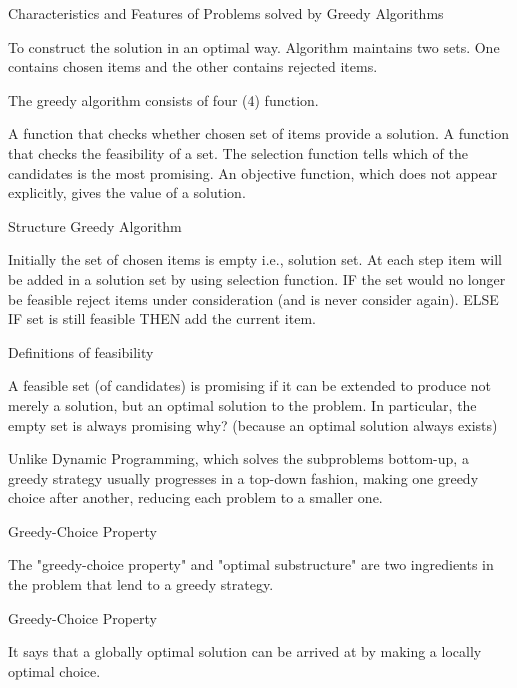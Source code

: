  

Characteristics and Features of Problems solved by Greedy Algorithms


To construct the solution in an optimal way. Algorithm maintains two sets. One contains chosen items and the other contains rejected items.

The greedy algorithm consists of four (4) function.

A function that checks whether chosen set of items provide a solution.
A function that checks the feasibility of a set.
The selection function tells which of the candidates is the most promising.
An objective function, which does not appear explicitly, gives the value of a solution.
 

Structure Greedy Algorithm

Initially the set of chosen items is empty i.e., solution set.
At each step
item will be added in a solution set by using selection function.
IF the set would no longer be feasible
reject items under consideration (and is never consider again).
ELSE IF set is still feasible THEN
add the current item.
 

Definitions of feasibility

A feasible set (of candidates) is promising if it can be extended to produce not merely a solution, but an optimal solution to the problem. In particular, the empty set is always promising why? (because an optimal solution always exists)

Unlike Dynamic Programming, which solves the subproblems bottom-up, a greedy strategy usually progresses in a top-down fashion, making one greedy choice after another, reducing each problem to a smaller one. 

Greedy-Choice Property

The "greedy-choice property" and "optimal substructure" are two ingredients in the problem that lend to a greedy strategy.

Greedy-Choice Property

It says that a globally optimal solution can be arrived at by making a locally optimal choice.

 

 



 

 
